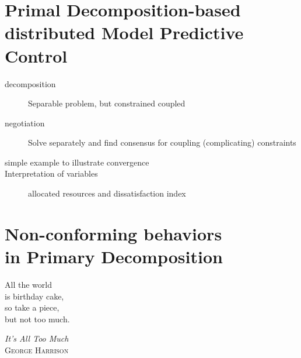 \documentclass[../main.tex]{subfiles}
\begin{document}
\printbibliography%

\chapter{Primal Decomposition-based distributed Model Predictive Control}
\begin{description}
  \item[decomposition] Separable problem, but constrained coupled
  \item[negotiation] Solve separately and find consensus for coupling (complicating) constraints
  \item[simple example to illustrate convergence]
  \item[Interpretation of variables] allocated resources and dissatisfaction index
\end{description}


\printbibliography%


\chapter[Non-conforming behaviors in Primary Decomposition]{Non-conforming behaviors\\ in Primary Decomposition}

\epigraph{\centering All the world\\ is birthday cake,\\ so take a piece, \\but not too much.}
{\textit{It's All Too Much}\\\textsc{George Harrison}}

\minitoc
\end{document}
